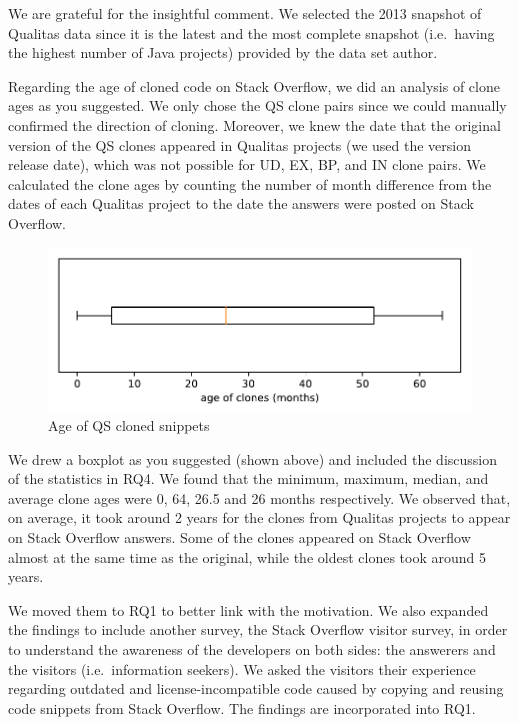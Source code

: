 \documentclass[a4paper,twoside,10pt]{reviewresponse}
\begin{document}
We are grateful for the insightful comment. We selected the 2013 snapshot of Qualitas data since it is the latest and the most complete snapshot (i.e.~having the highest number of Java projects) provided by the data set author. 

Regarding the age of cloned code on Stack Overflow, we did an analysis of clone ages as you suggested. We only chose the QS clone pairs since we could manually confirmed the direction of cloning. Moreover, we knew the date that the original version of the QS clones appeared in Qualitas projects (we used the version release date), which was not possible for UD, EX, BP, and IN clone pairs. 
We calculated the clone ages by counting the number of month difference from the dates of each Qualitas project to the date the answers were posted on Stack Overflow.

\begin{figure}[H]
	\centering
	\includegraphics[width=0.7\linewidth]{../boxplot_clone_age}
	\caption{Age of QS cloned snippets}
	\label{fig:boxplotcloneage}
\end{figure}

We drew a boxplot as you suggested (shown above) and included the discussion of the statistics in RQ4. We found that the minimum, maximum, median, and average clone ages were 0, 64, 26.5 and 26 months respectively. 
We observed that, on average, it took around 2 years for the clones from Qualitas projects to appear on Stack Overflow answers. Some of the clones appeared on Stack Overflow almost at the same time as the original, while the oldest clones took around 5 years.


We moved them to RQ1 to better link with the motivation. We also expanded the findings to include another survey, the Stack Overflow visitor survey, in order to understand the awareness of the developers on both sides: the answerers and the visitors (i.e.~information seekers). We asked the visitors their experience regarding outdated and license-incompatible code caused by copying and reusing code snippets from Stack Overflow. The findings are incorporated into RQ1.
\end{document}
